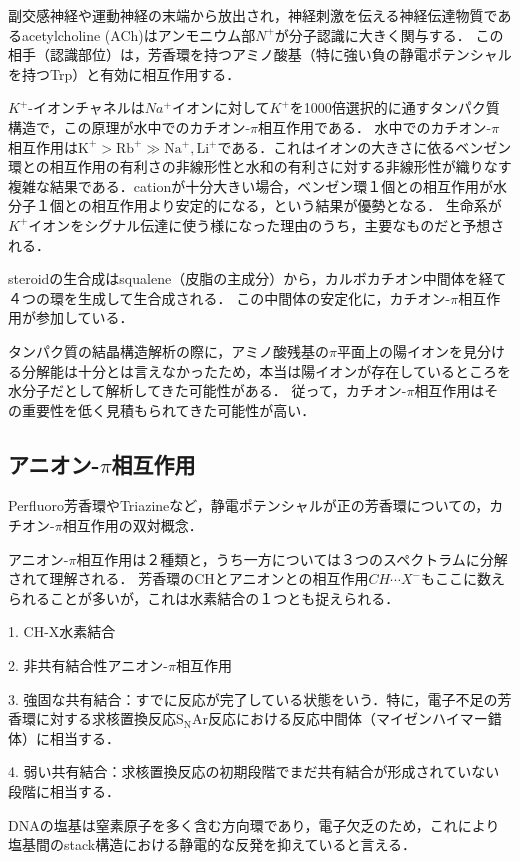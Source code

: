 \documentclass[uplatex, dvipdfmx]{jsreport}
\begin{document}
\begin{example}
    副交感神経や運動神経の末端から放出され，神経刺激を伝える神経伝達物質であるacetylcholine (ACh)はアンモニウム部$N^+$が分子認識に大きく関与する．
    この相手（認識部位）は，芳香環を持つアミノ酸基（特に強い負の静電ポテンシャルを持つTrp）と有効に相互作用する．

    $K^+$-イオンチャネルは$Na^+$イオンに対して$K^+$を1000倍選択的に通すタンパク質構造で，この原理が水中でのカチオン-$\pi$相互作用である．
    水中でのカチオン-$\pi$相互作用は$\mathrm{K^+>Rb^+\gg Na^+,Li^+}$である．これはイオンの大きさに依るベンゼン環との相互作用の有利さの非線形性と水和の有利さに対する非線形性が織りなす複雑な結果である．cationが十分大きい場合，ベンゼン環１個との相互作用が水分子１個との相互作用より安定的になる，という結果が優勢となる．
    生命系が$K^+$イオンをシグナル伝達に使う様になった理由のうち，主要なものだと予想される．
\end{example}
\begin{example}[steroidの生合成]
    steroidの生合成はsqualene（皮脂の主成分）から，カルボカチオン中間体を経て４つの環を生成して生合成される．
    この中間体の安定化に，カチオン-$\pi$相互作用が参加している．
\end{example}
\begin{remark}
    タンパク質の結晶構造解析の際に，アミノ酸残基の$\pi$平面上の陽イオンを見分ける分解能は十分とは言えなかったため，本当は陽イオンが存在しているところを水分子だとして解析してきた可能性がある．
    従って，カチオン-$\pi$相互作用はその重要性を低く見積もられてきた可能性が高い．
\end{remark}

\subsection{アニオン-$\pi$相互作用}
\begin{definition}
    Perfluoro芳香環やTriazineなど，静電ポテンシャルが正の芳香環についての，カチオン-$\pi$相互作用の双対概念．

    アニオン-$\pi$相互作用は２種類と，うち一方については３つのスペクトラムに分解されて理解される．
    芳香環のCHとアニオンとの相互作用$CH\cdots X^-$もここに数えられることが多いが，これは水素結合の１つとも捉えられる．

    1. CH-X水素結合

    2. 非共有結合性アニオン-$\pi$相互作用

    3. 強固な共有結合：すでに反応が完了している状態をいう．特に，電子不足の芳香環に対する求核置換反応$\mathrm{S_NAr}$反応における反応中間体（マイゼンハイマー錯体）に相当する．

    4. 弱い共有結合：求核置換反応の初期段階でまだ共有結合が形成されていない段階に相当する．
\end{definition}
\begin{example}
    DNAの塩基は窒素原子を多く含む方向環であり，電子欠乏のため，これにより塩基間のstack構造における静電的な反発を抑えていると言える．
\end{example}
\end{document}
